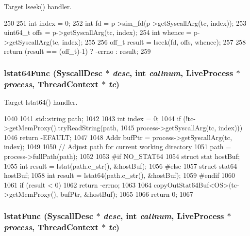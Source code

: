 Target lseek() handler. 


\begin{DoxyCode}
250 {
251     int index = 0;
252     int fd = p->sim_fd(p->getSyscallArg(tc, index));
253     uint64_t offs = p->getSyscallArg(tc, index);
254     int whence = p->getSyscallArg(tc, index);
255 
256     off_t result = lseek(fd, offs, whence);
257 
258     return (result == (off_t)-1) ? -errno : result;
259 }
\end{DoxyCode}
\hypertarget{syscall__emul_8hh_a6a65e067e9f7873eb4153258df5b34e0}{
\subsubsection[{lstat64Func}]{ lstat64Func ({\bf SyscallDesc} $\ast$ {\em desc}, \/  int {\em callnum}, \/  {\bf LiveProcess} $\ast$ {\em process}, \/  {\bf ThreadContext} $\ast$ {\em tc})}}
\label{syscall__emul_8hh_a6a65e067e9f7873eb4153258df5b34e0}


Target lstat64() handler. 


\begin{DoxyCode}
1040 {
1041     std::string path;
1042 
1043     int index = 0;
1044     if (!tc->getMemProxy().tryReadString(path,
1045                 process->getSyscallArg(tc, index))) {
1046         return -EFAULT;
1047     }
1048     Addr bufPtr = process->getSyscallArg(tc, index);
1049 
1050     // Adjust path for current working directory
1051     path = process->fullPath(path);
1052 
1053 #if NO_STAT64
1054     struct stat hostBuf;
1055     int result = lstat(path.c_str(), &hostBuf);
1056 #else
1057     struct stat64 hostBuf;
1058     int result = lstat64(path.c_str(), &hostBuf);
1059 #endif
1060 
1061     if (result < 0)
1062         return -errno;
1063 
1064     copyOutStat64Buf<OS>(tc->getMemProxy(), bufPtr, &hostBuf);
1065 
1066     return 0;
1067 }
\end{DoxyCode}
\hypertarget{syscall__emul_8hh_a720a371d0fcbe5f6ef57bee91d7fe238}{
\subsubsection[{lstatFunc}]{ lstatFunc ({\bf SyscallDesc} $\ast$ {\em desc}, \/  int {\em callnum}, \/  {\bf LiveProcess} $\ast$ {\em process}, \/  {\bf ThreadContext} $\ast$ {\em tc})}}
\label{syscall__emul_8hh_a720a371d0fcbe5f6ef57bee91d7fe238}


